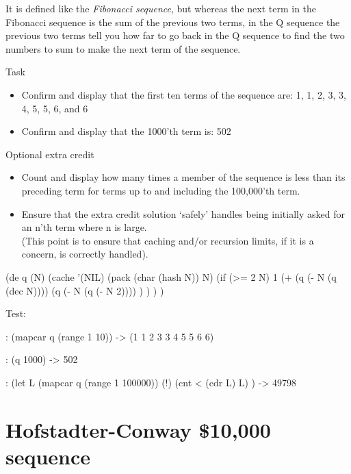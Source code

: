 \begin{itemize}
It is defined like the \emph{Fibonacci sequence}, but whereas the next
term in the Fibonacci sequence is the sum of the previous two terms,
in the Q sequence the previous two terms tell you how far to go back
in the Q sequence to find the two numbers to sum to make the next term
of the sequence.

\begin{description}
\item[Task]
\end{description}

\begin{itemize}
\item
  Confirm and display that the first ten terms of the sequence are: 1,
  1, 2, 3, 3, 4, 5, 5, 6, and 6
\item
  Confirm and display that the 1000'th term is: 502
\end{itemize}

Optional extra credit

\begin{itemize}
\item
  Count and display how many times a member of the sequence is less than
  its preceding term for terms up to and including the 100,000'th term.
\item
  Ensure that the extra credit solution `safely' handles being initially
  asked for an n'th term where n is large.\\ (This point is to ensure
  that caching and/or recursion limits, if it is a concern, is correctly
  handled).
\end{itemize}


\begin{wideverbatim}

(de q (N)
   (cache '(NIL) (pack (char (hash N)) N)
      (if (>= 2 N)
         1
         (+
            (q (- N (q (dec N))))
            (q (- N (q (- N 2)))) ) ) ) )

Test:

: (mapcar q (range 1 10))
-> (1 1 2 3 3 4 5 5 6 6)

: (q 1000)
-> 502

: (let L (mapcar q (range 1 100000)) (!)
   (cnt < (cdr L) L) )
-> 49798

\end{wideverbatim}

\pagebreak{}
\section*{Hofstadter-Conway \$10,000 sequence}


\end{itemize}

